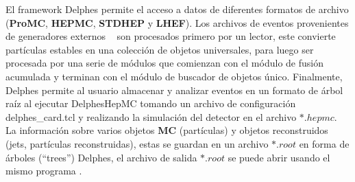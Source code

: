 El framework Delphes permite el acceso a datos de diferentes formatos de archivo (\textbf{ProMC}, \textbf{HEPMC}, \textbf{STDHEP} y \textbf{LHEF}). Los archivos de eventos provenientes de generadores externos \MC ~ son procesados primero por un lector, este convierte partículas estables en una colección de objetos universales, para luego ser procesada por una serie de módulos que comienzan con el módulo de fusión acumulada y terminan con el módulo de buscador de objetos único. Finalmente, Delphes permite al usuario almacenar y analizar eventos en un formato de árbol raíz al ejecutar DelphesHepMC tomando un archivo de configuración delphes\_card.tcl y realizando la simulación del detector en el archivo $*.hepmc$. La información sobre varios objetos \textbf{MC }(partículas) y objetos reconstruidos (jets, partículas reconstruidas), estas se guardan en un archivo $*.root$ en forma de árboles (``trees'') Delphes, el archivo de salida $*.root$ se puede abrir usando el mismo programa \ROOT.






